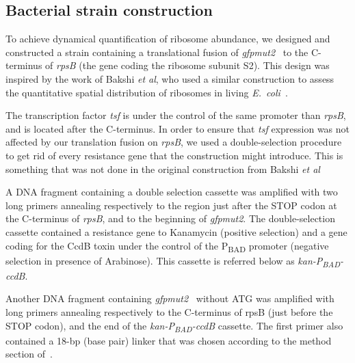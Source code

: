 \subsection{Bacterial strain construction}

To achieve dynamical quantification of ribosome abundance, we designed and constructed a strain containing a translational fusion of \textit{gfpmut2}~\cite{zaslaver_comprehensive_2006} to the C-terminus of \textit{rpsB} (the gene coding the ribosome subunit S2).
This design was inspired by the work of Bakshi \textit{et al}, who used a similar construction to assess the quantitative spatial distribution of ribosomes in living \textit{E.~coli}~\cite{bakshi_superresolution_2012}.

The transcription factor \textit{tsf} is under the control of the same promoter than \textit{rpsB}, and is located after the C-terminus.
In order to ensure that \textit{tsf} expression was not affected by our translation fusion on \textit{rpsB}, we used a double-selection procedure to get rid of every resistance gene that the construction might introduce.
This is something that was not done in the original construction from Bakshi \textit{et al}~\cite{bakshi_superresolution_2012}

A DNA fragment containing a double selection cassette was amplified with two long primers annealing respectively to the region just after the STOP codon at the C-terminus of \textit{rpsB}, and to the beginning of \textit{gfpmut2}.
The double-selection cassette contained a resistance gene to Kanamycin (positive selection) and a gene coding for the CcdB toxin under the control of the P\textsubscript{BAD} promoter (negative selection in presence of Arabinose).
This cassette is referred below as \textit{kan-P\textsubscript{BAD}-ccdB}.

Another DNA fragment containing \textit{gfpmut2}~\cite{zaslaver_comprehensive_2006} without ATG was amplified with long primers annealing respectively to the C-terminus of rpsB (just before the STOP codon), and the end of the \textit{kan-P\textsubscript{BAD}-ccdB} cassette.
The first primer also contained a 18-bp (base pair) linker that was chosen according to the method section of~\cite{bakshi_superresolution_2012}.


